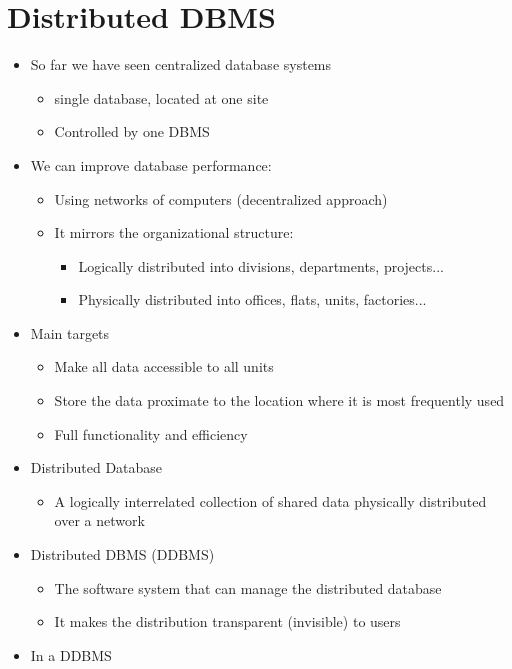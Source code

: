 \documentclass{article}[18pt]
\begin{document}
\section{Distributed DBMS}
\begin{itemize}
	\item So far we have seen centralized database systems
	\begin{itemize}
		\item single database, located at one site
		\item Controlled by one DBMS
	\end{itemize}
	\item We can improve database performance:
	\begin{itemize}
		\item Using networks of computers (decentralized approach)
		\item It mirrors the organizational structure:
		\begin{itemize}
			\item Logically distributed into divisions, departments, projects...
			\item Physically distributed into offices, flats, units, factories...
		\end{itemize}
	\end{itemize}
	\item Main targets
	\begin{itemize}
		\item Make all data accessible to all units
		\item Store the data proximate to the location where it is most frequently used
		\item Full functionality and efficiency
	\end{itemize}
	\item Distributed Database
	\begin{itemize}
		\item A logically interrelated collection of shared data physically distributed over a network
	\end{itemize}
	\item Distributed DBMS (DDBMS)
	\begin{itemize}
		\item The software system that can manage the distributed database
		\item It makes the distribution transparent (invisible) to users
	\end{itemize}
	\item In a DDBMS
	\begin{itemize}

\end{itemize}
\end{itemize}
\end{document}
